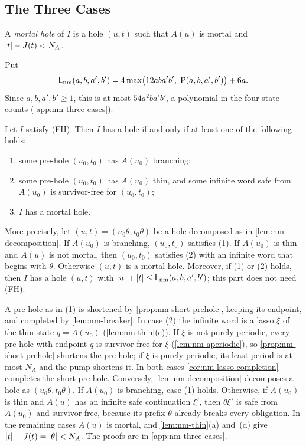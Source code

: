\subsection{The Three Cases}\label{sec:nm-three-cases}

\begin{definition}\label{def:nm-mortal-hole}
A \emph{mortal hole} of $I$ is a hole $(u,t)$ such that $A(u)$ is mortal and
$\lvert t\rvert-J(t)<N_A$.
\end{definition}

Put
\[
 \Lnm(a,b,a',b')=4\max\bigl(12aba'b',\ \Pcap(a,b,a',b')\bigr)+6a .
\]
Since $a,b,a',b'\ge1$, this is at most $54a^2ba'b'$, a polynomial in the four
state counts (\cref{app:nm-three-cases}).

\begin{theorem}\label{thm:nm-three-cases}
Let $I$ satisfy \textup{(FH)}. Then $I$ has a hole if and only if at least one
of the following holds:
\begin{enumerate}[label=(\arabic*)]
\item some pre-hole $(u_0,t_0)$ has $A(u_0)$ branching;
\item some pre-hole $(u_0,t_0)$ has $A(u_0)$ thin, and some infinite word safe
from $A(u_0)$ is survivor-free for $(u_0,t_0)$;
\item $I$ has a mortal hole.
\end{enumerate}
More precisely, let $(u,t)=(u_0\theta,t_0\theta)$ be a hole decomposed as in
\cref{lem:nm-decomposition}. If $A(u_0)$ is branching, $(u_0,t_0)$ satisfies
\textup{(1)}. If $A(u_0)$ is thin and $A(u)$ is not mortal, then $(u_0,t_0)$
satisfies \textup{(2)} with an infinite word that begins with $\theta$.
Otherwise $(u,t)$ is a mortal hole. Moreover, if \textup{(1)} or \textup{(2)}
holds, then $I$ has a hole $(u,t)$ with $\lvert u\rvert+\lvert t\rvert\le\mathsf L_{\mathrm{nm}}(a,b,a',b')$; this
part does not need \textup{(FH)}.
\end{theorem}

A pre-hole as in (1) is shortened by \cref{prop:nm-short-prehole}, keeping its
endpoint, and completed by \cref{lem:nm-breaker}. In case (2) the infinite
word is a lasso $\xi$ of the thin state $q=A(u_0)$ (\cref{lem:nm-thin}(c)). If
$\xi$ is not purely periodic, every pre-hole with endpoint $q$ is
survivor-free for $\xi$ (\cref{lem:nm-aperiodic}), so
\cref{prop:nm-short-prehole} shortens the pre-hole; if $\xi$ is purely
periodic, its least period is at most $N_A$ and the pump shortens it. In both
cases \cref{cor:nm-lasso-completion} completes the short pre-hole. Conversely,
\cref{lem:nm-decomposition} decomposes a hole as $(u_0\theta,t_0\theta)$. If
$A(u_0)$ is branching, case (1) holds. Otherwise, if $A(u_0)$ is thin and
$A(u)$ has an infinite safe continuation $\xi'$, then $\theta\xi'$ is safe from
$A(u_0)$ and survivor-free, because its prefix $\theta$ already breaks every
obligation. In the remaining cases $A(u)$ is mortal, and
\cref{lem:nm-thin}(a) and~(d) give $\lvert t\rvert-J(t)=\lvert \theta\rvert<N_A$. The proofs are
in \cref{app:nm-three-cases}.

